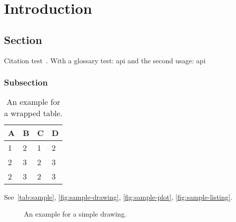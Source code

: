 
\chapter{Introduction}\label{chapter:introduction}

\section{Section}
Citation test~\parencite{latex}. With a glossary test: \gls{api} and the second usage: \gls{api}

\subsection{Subsection}


\begin{wraptable}{r}{5.5cm}
    \centering
    \begin{tabular}{l l l l}
      \toprule
      \multicolumn{1}{c}{\textbf{A}\footnotemark} & \textbf{B} & \textbf{C} & \textbf{D} \\
      \midrule
        1\footnotemark & 2 & 1 & 2 \\ \rowcolor{TUMAccentLightBlue!30}
        2 & 3 & 2 & 3 \\
        2 & 3 & 2 & 3 \\
      \bottomrule
    \end{tabular}
    \caption[Example table]{An example for a wrapped table.}\label{tab:sample}
  \end{wraptable}
  \addtocounter{footnote}{-1}
  \addtocounter{footnote}{1}
See~\autoref{tab:sample}, \autoref{fig:sample-drawing}, \autoref{fig:sample-plot}, \autoref{fig:sample-listing}.

\lipsum[1-2]


\begin{figure}[htpb]
  \centering
  \caption[Example drawing]{An example for a simple drawing.}\label{fig:sample-drawing}
\end{figure}

